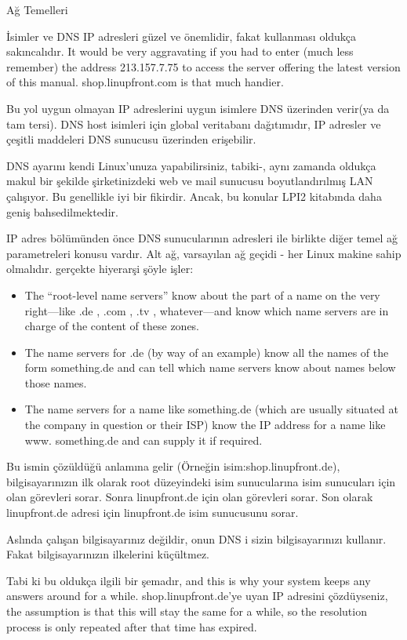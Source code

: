 \begin{section}{Ağ Temelleri}
\begin{subsection}{İsimler ve DNS}
IP adresleri güzel ve önemlidir, fakat kullanması oldukça sakıncalıdır. It would be very aggravating if you had to enter (much less remember) the address 213.157.7.75 to access the server offering the latest version of this manual. shop.linupfront.com is that much handier.

Bu yol uygun olmayan IP adreslerini uygun isimlere DNS üzerinden verir(ya da tam tersi). DNS host isimleri için global veritabanı dağıtımıdır, IP adresler ve çeşitli maddeleri DNS sunucusu üzerinden erişebilir.

DNS ayarını kendi Linux'unuza yapabilirsiniz, tabiki-, aynı zamanda oldukça makul bir şekilde şirketinizdeki web ve mail sunucusu boyutlandırılmış LAN çalışıyor. Bu genellikle iyi bir fikirdir. Ancak, bu konular LPI2 kitabında daha geniş bahsedilmektedir.

IP adres bölümünden önce DNS sunucularının adresleri ile birlikte diğer temel ağ parametreleri konusu vardır. Alt ağ, varsayılan ağ geçidi - her Linux makine sahip olmalıdır. gerçekte hiyerarşi şöyle işler:

\begin{itemize}
\item The “root-level name servers” know about the part of a name on the very
right—like .de , .com , .tv , whatever—and know which name servers are in
charge of the content of these zones.
\item The name servers for .de (by way of an example) know all the names of
the form something.de and can tell which name servers know about names
below those names.
\item The name servers for a name like something.de (which are usually situated
at the company in question or their ISP) know the IP address for a name like
www. something.de and can supply it if required.
\end{itemize}

Bu ismin çözüldüğü anlamına gelir (Örneğin isim:shop.linupfront.de), bilgisayarınızın ilk olarak root düzeyindeki isim sunucularına isim sunucuları için olan görevleri sorar. Sonra linupfront.de için olan görevleri sorar. Son olarak linupfront.de adresi için linupfront.de isim sunucusunu sorar.

Aslında çalışan bilgisayarınız değildir, onun DNS i sizin bilgisayarınızı kullanır. Fakat bilgisayarınızın ilkelerini küçültmez.

Tabi ki bu oldukça ilgili bir şemadır, and this is why your system keeps any answers around for a while. shop.linupfront.de'ye uyan IP adresini çözdüyseniz, the assumption is that this will stay the same for a while, so the resolution process is only repeated after that time has expired.


\end{subsection}
\end{section}
